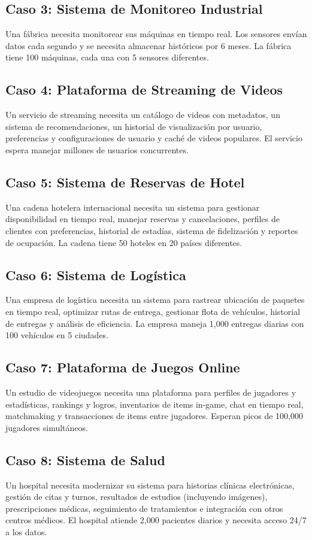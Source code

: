 \documentclass[12pt]{article}
\begin{document}
\subsection{Caso 3: Sistema de Monitoreo Industrial}
Una fábrica necesita monitorear sus máquinas en tiempo real. Los sensores envían datos cada segundo y se necesita almacenar históricos por 6 meses. La fábrica tiene 100 máquinas, cada una con 5 sensores diferentes.

\subsection{Caso 4: Plataforma de Streaming de Videos}
Un servicio de streaming necesita un catálogo de videos con metadatos, un sistema de recomendaciones, un historial de visualización por usuario, preferencias y configuraciones de usuario y caché de videos populares. El servicio espera manejar millones de usuarios concurrentes.

\subsection{Caso 5: Sistema de Reservas de Hotel}
Una cadena hotelera internacional necesita un sistema para gestionar disponibilidad en tiempo real, manejar reservas y cancelaciones, perfiles de clientes con preferencias, historial de estadías, sistema de fidelización y reportes de ocupación. La cadena tiene 50 hoteles en 20 países diferentes.

\subsection{Caso 6: Sistema de Logística}
Una empresa de logística necesita un sistema para rastrear ubicación de paquetes en tiempo real, optimizar rutas de entrega, gestionar flota de vehículos, historial de entregas y análisis de eficiencia. La empresa maneja 1,000 entregas diarias con 100 vehículos en 5 ciudades.

\subsection{Caso 7: Plataforma de Juegos Online}
Un estudio de videojuegos necesita una plataforma para perfiles de jugadores y estadísticas, rankings y logros, inventarios de items in-game, chat en tiempo real, matchmaking y transacciones de items entre jugadores. Esperan picos de 100,000 jugadores simultáneos.

\subsection{Caso 8: Sistema de Salud}
Un hospital necesita modernizar su sistema para historias clínicas electrónicas, gestión de citas y turnos, resultados de estudios (incluyendo imágenes), prescripciones médicas, seguimiento de tratamientos e integración con otros centros médicos. El hospital atiende 2,000 pacientes diarios y necesita acceso 24/7 a los datos.
\end{document}
